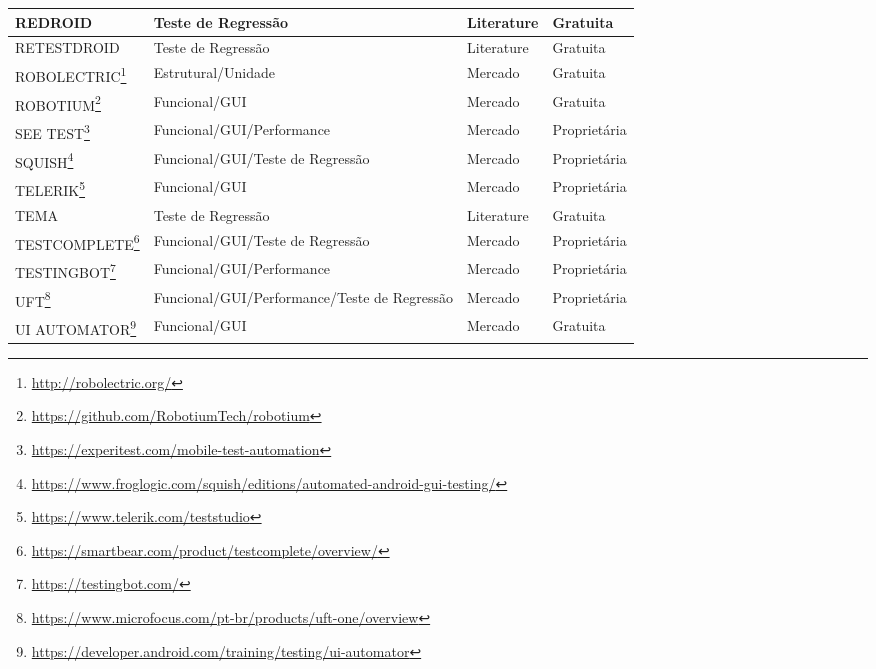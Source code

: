 \begin{table}[h!]
\begin{center}
\begin{tabular}{m{4cm}m{5cm}m{3cm}m{3cm}}
        REDROID \cite{Do2016RedroidAR} & Teste de Regressão & Literature & Gratuita\\\hline
        RETESTDROID \cite{8377661} & Teste de Regressão & Literature & Gratuita\\\hline
        ROBOLECTRIC\footnote{\url{http://robolectric.org/}} & Estrutural/Unidade & Mercado & Gratuita\\\hline
        ROBOTIUM\footnote{\url{https://github.com/RobotiumTech/robotium}} & Funcional/GUI & Mercado & Gratuita\\\hline
        SEE TEST\footnote{\url{https://experitest.com/mobile-test-automation}} & Funcional/GUI/Performance & Mercado & Proprietária\\\hline
        SQUISH\footnote{\url{https://www.froglogic.com/squish/editions/automated-android-gui-testing/}} & Funcional/GUI/Teste de Regressão & Mercado & Proprietária\\\hline
        TELERIK\footnote{\url{https://www.telerik.com/teststudio}} & Funcional/GUI & Mercado & Proprietária\\\hline
        TEMA \cite{5770627} & Teste de Regressão & Literature & Gratuita\\\hline
        TESTCOMPLETE\footnote{\url{https://smartbear.com/product/testcomplete/overview/}} & Funcional/GUI/Teste de Regressão & Mercado & Proprietária\\\hline
        TESTINGBOT\footnote{\url{https://testingbot.com/}} & Funcional/GUI/Performance & Mercado & Proprietária\\\hline
        UFT\footnote{\url{https://www.microfocus.com/pt-br/products/uft-one/overview}} & Funcional/GUI/Performance/Teste de Regressão & Mercado & Proprietária\\\hline
        UI AUTOMATOR\footnote{\url{https://developer.android.com/training/testing/ui-automator}} & Funcional/GUI & Mercado & Gratuita\\\hline
\end{tabular}
\end{center}
\end{table}



